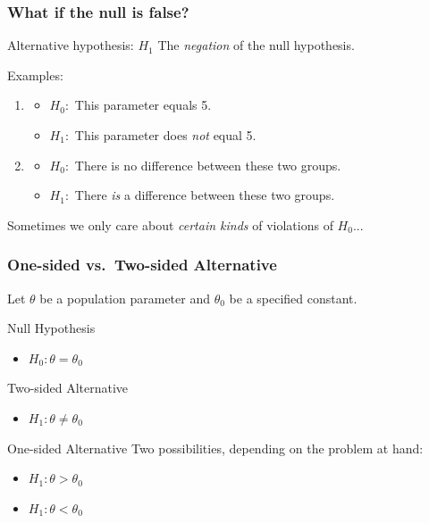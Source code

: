 \begin{frame}
	\frametitle{What if the null is false?}

	\begin{block}
		{Alternative hypothesis: $H_1$}
		The \emph{negation} of the null hypothesis.
	\end{block}
	\begin{block}
		{Examples:}
		\begin{enumerate}
			\item 
				\begin{itemize}
					\item $H_0\colon$ This parameter equals 5.
				\item $H_1\colon$ This parameter does \emph{not} equal 5.
		\end{itemize}
			\item 
				\begin{itemize}
					\item $H_0\colon$ There is no difference between these two groups.
					\item $H_1\colon$ There \emph{is} a difference between these two groups.
				\end{itemize}
		\end{enumerate}
		
	\end{block}

	\alert{Sometimes we only care about \emph{certain kinds} of violations of $H_0$...}
\end{frame}
\begin{frame}
\frametitle{One-sided vs.\ Two-sided Alternative}
\alert{Let $\theta$ be a population parameter and $\theta_0$ be a specified constant.}
\begin{block}
	{Null Hypothesis}
\begin{itemize}
	\item $H_0\colon \theta = \theta_0$
\end{itemize}\end{block}
	\begin{block}{Two-sided Alternative}
		\begin{itemize}
			\item $H_1\colon \theta \neq \theta_0$
		\end{itemize}
\end{block}
	\begin{block}{One-sided Alternative}
		Two possibilities, depending on the problem at hand:
		\begin{itemize}
			\item $H_1\colon \theta > \theta_0$
			\item $H_1\colon \theta < \theta_0$
		\end{itemize}
\end{block}
\end{frame}

